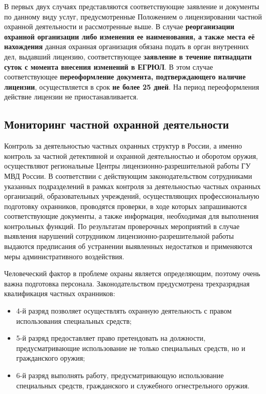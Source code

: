 \documentclass[a4paper,12pt,fleqn]{article} %
\begin{document}
В первых двух случаях представляются соответствующие заявление и документы по данному виду услуг, предусмотренные Положением о лицензировании частной охранной деятельности и рассмотренные выше. 	В случае \textbf{реорганизации охранной организации либо изменения ее наименования, а также места её нахождения} данная охранная организация обязана подать в орган внутренних дел, выдавший лицензию, соответствующее \textbf{заявление в течение пятнадцати суток с момента внесения изменений в ЕГРЮЛ}. В этом случае соответствующее \textbf{переоформление документа, подтверждающего наличие лицензии}, осуществляется в срок \textbf{не более 25  дней}. На период переоформления действие лицензии не приостанавливается.

\subsection{Мониторинг частной охранной деятельности}

Контроль за деятельностью частных охранных структур в России, а именно  контроль за частной детективной и охранной деятельностью и оборотом оружия, осуществляют региональные Центры лицензионно-разрешительной работы ГУ МВД России.  В соответствии с действующим законодательством сотрудниками указанных подразделений в рамках контроля за деятельностью частных охранных организаций, образовательных учреждений, осуществляющих профессиональную подготовку охранников, проводятся проверки, в ходе которых запрашиваются соответствующие документы, а также информация, необходимая для выполнения контрольных функций. По результатам проверочных мероприятий в случае выявления нарушений сотрудником лицензионно-разрешительной работы выдаются предписания об устранении выявленных недостатков и применяются меры административного воздействия.

Человеческий фактор в проблеме охраны является определяющим, поэтому очень важна подготовка персонала. Законодательством предусмотрена трехразрядная квалификация частных охранников: 

\begin{itemize}
	\item 4-й разряд позволяет осуществлять охранную деятельность с правом использования специальных средств; 
	\item 5-й разряд предоставляет право претендовать на должности, предусматривающие использование не только специальных средств, но и гражданского оружия; 
	\item 6-й разряд выполнять работу, предусматривающую использование специальных средств, гражданского и служебного огнестрельного оружия.
\end{itemize}
\end{document}
